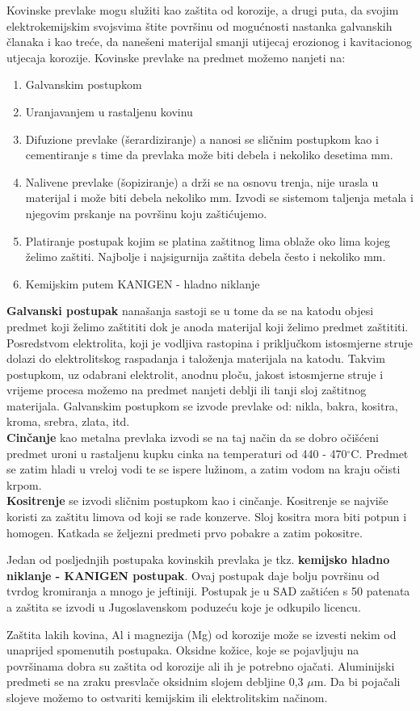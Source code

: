 \documentclass[a4paper,12pt]{article}
\numberwithin{figure}{section}
\begin{document}
Kovinske prevlake mogu služiti kao zaštita od korozije, a drugi puta, da svojim elektrokemijskim svojsvima štite površinu od mogućnosti nastanka galvanskih članaka i kao treće, da nanešeni materijal smanji utijecaj erozionog i kavitacionog utjecaja korozije.
Kovinske prevlake na predmet možemo nanjeti na:
\begin{enumerate}
\item Galvanskim postupkom
\item Uranjavanjem u rastaljenu kovinu
\item Difuzione prevlake (šerardiziranje) a nanosi se sličnim postupkom kao i cementiranje s time da prevlaka može biti debela i nekoliko desetima mm.
\item Nalivene prevlake (šopiziranje) a drži se na osnovu trenja, nije urasla u materijal i može biti debela nekoliko mm. Izvodi se sistemom taljenja metala i njegovim prskanje na površinu koju zaštićujemo.
\item Platiranje postupak kojim se platina zaštitnog lima oblaže oko lima kojeg želimo zaštiti. Najbolje i najsigurnija zaštita debela često i nekoliko mm.
\item Kemijskim putem KANIGEN - hladno niklanje 
\end{enumerate} 
\textbf{Galvanski postupak} nanašanja sastoji se u tome da se na katodu objesi predmet koji želimo zaštititi dok je anoda materijal koji želimo predmet zaštititi. Posredstvom elektrolita, koji je vodljiva rastopina i priključkom istosmjerne struje dolazi do elektrolitskog raspadanja i taloženja materijala na katodu. Takvim postupkom, uz odabrani elektrolit, anodnu ploču, jakost istosmjerne struje i vrijeme procesa možemo na predmet nanjeti deblji ili tanji sloj zaštitnog materijala. Galvanskim postupkom se izvode prevlake od: nikla, bakra, kositra, kroma, srebra, zlata, itd.\\
\textbf{Cinčanje} kao metalna prevlaka izvodi se na taj način da se dobro očišćeni predmet uroni u rastaljenu kupku cinka na temperaturi od 440 - 470$^{\circ}$C. Predmet se zatim hladi u vreloj vodi te se ispere lužinom, a zatim vodom na kraju očisti krpom.\\
\textbf{Kositrenje} se izvodi sličnim postupkom kao i cinčanje. Kositrenje se najviše koristi za zaštitu limova od koji se rade konzerve. Sloj kositra mora biti potpun i homogen. Katkada se željezni predmeti prvo pobakre a zatim pokositre.\par
Jedan od posljednjih postupaka kovinskih prevlaka je tkz. \textbf{kemijsko hladno niklanje - KANIGEN postupak}. Ovaj postupak daje bolju površinu od tvrdog kromiranja a mnogo je jeftiniji. Postupak je u SAD zaštićen s 50 patenata a zaštita se izvodi u Jugoslavenskom poduzeću koje je odkupilo licencu. \par
Zaštita lakih kovina, Al i magnezija (Mg) od korozije može se izvesti nekim od unaprijed spomenutih postupaka. Oksidne kožice, koje se pojavljuju na površinama dobra su zaštita od korozije ali ih je potrebno ojačati. Aluminijski predmeti se na zraku presvlače oksidnim slojem debljine 0,3 $\mu$m. Da bi pojačali slojeve možemo to ostvariti kemijskim ili elektrolitskim načinom.
\end{document}
